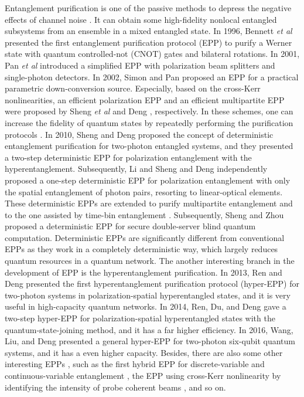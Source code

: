 \documentclass[aps,graphicx,twocolumn]{revtex4}%
\begin{document}
Entanglement purification is one of the passive methods to depress
the negative effects of channel noise \cite{Qerrer}. It can obtain
some high-fidelity nonlocal entangled subsystems from an ensemble in
a mixed entangled state. In 1996, Bennett \emph{et al} \cite{EPP1B}
presented the first entanglement purification protocol (EPP) to
purify a Werner state with quantum controlled-not (CNOT) gates and
bilateral rotations. In 2001, Pan \emph{et al} \cite{EPPpan01}
introduced a simplified EPP with polarization beam splitters and
single-photon detectors. In 2002, Simon and Pan \cite{EPPpan2}
proposed an EPP for a practical parametric down-conversion source.
Especially, based on the cross-Kerr nonlinearities, an efficient
polarization EPP and an efficient multipartite EPP were proposed by
Sheng \emph{et al} \cite{EPPSheng1}  and Deng \cite{EPPpdeng1},
respectively. In these schemes, one can increase the fidelity of
quantum states by repeatedly performing the purification protocols
\cite{EPPSheng1,EPPpdeng1}. In 2010, Sheng and Deng \cite{DEPP1}
proposed the concept of deterministic entanglement purification for
two-photon entangled systems, and they presented a two-step
deterministic EPP for polarization entanglement with the
hyperentanglement. Subsequently, Li \cite{DEPP2} and Sheng and Deng
\cite{DEPP3} independently proposed a one-step deterministic EPP for
polarization entanglement with only the spatial entanglement of
photon pairs, resorting to linear-optical elements. These
deterministic EPPs are extended to purify multipartite entanglement
\cite{DEPP4} and to the one assisted by time-bin entanglement
\cite{DEPP5}. Subsequently, Sheng and Zhou \cite{EPPsl2} proposed a
deterministic EPP for secure double-server blind quantum
computation. Deterministic EPPs
\cite{DEPP1,DEPP2,DEPP3,DEPP4,DEPP5,EPPsl2} are significantly
different from conventional EPPs
\cite{EPP1B,Qerrer,EPPpan01,EPPpan2,EPPSheng1,EPPpdeng1} as they
work in a completely deterministic way, which  largely reduces
quantum resources in a quantum network. The another interesting
branch in the development of EPP is the hyperentanglement
purification. In 2013, Ren and Deng \cite{HEPP1} presented the first
hyperentanglement purification protocol (hyper-EPP) for two-photon
systems in polarization-spatial hyperentangled states, and it is
very useful in  high-capacity quantum networks. In 2014, Ren, Du,
and Deng \cite{HEPP2} gave a two-step hyper-EPP for
polarization-spatial hyperentangled states with the
quantum-state-joining method, and it has a far higher efficiency. In
2016, Wang, Liu, and Deng \cite{HEPP3} presented a general hyper-EPP
for two-photon six-qubit quantum systems, and it has a even higher
capacity. Besides, there are also some other interesting EPPs
\cite{EPPHybrid,EPPKerr,DEPPw1,DEPPw2,DEPPw3,DEPPw4}, such as the
first hybrid EPP for discrete-variable and continuous-variable
entanglement \cite{EPPHybrid}, the EPP using cross-Kerr nonlinearity
by identifying the intensity of probe coherent beams \cite{EPPKerr},
and so on.
\end{document}
